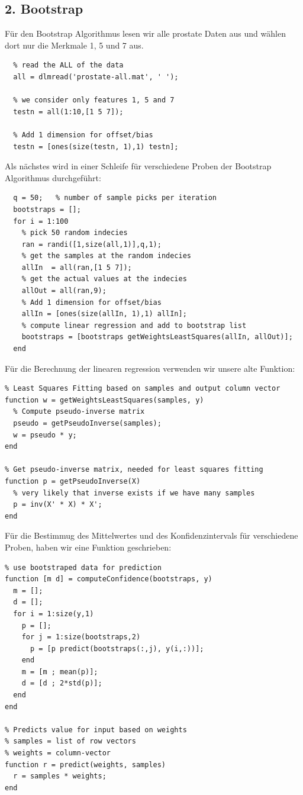 \documentclass{article}
\begin{document}
\subsection*{2. Bootstrap}
Für den Bootstrap Algorithmus lesen wir alle prostate Daten aus und wählen dort
nur die Merkmale 1, 5 und 7 aus.
\begin{lstlisting}
  % read the ALL of the data
  all = dlmread('prostate-all.mat', ' ');

  % we consider only features 1, 5 and 7
  testn = all(1:10,[1 5 7]);

  % Add 1 dimension for offset/bias
  testn = [ones(size(testn, 1),1) testn];
\end{lstlisting}
Als nächstes wird in einer Schleife für verschiedene Proben der Bootstrap
Algorithmus durchgeführt:
\begin{lstlisting}
  q = 50;   % number of sample picks per iteration
  bootstraps = [];
  for i = 1:100
    % pick 50 random indecies
    ran = randi([1,size(all,1)],q,1);
    % get the samples at the random indecies
    allIn  = all(ran,[1 5 7]);
    % get the actual values at the indecies
    allOut = all(ran,9);
    % Add 1 dimension for offset/bias
    allIn = [ones(size(allIn, 1),1) allIn];
    % compute linear regression and add to bootstrap list
    bootstraps = [bootstraps getWeightsLeastSquares(allIn, allOut)];
  end
\end{lstlisting}
Für die Berechnung der linearen regression verwenden wir unsere alte Funktion:
\begin{lstlisting}
% Least Squares Fitting based on samples and output column vector
function w = getWeightsLeastSquares(samples, y)
  % Compute pseudo-inverse matrix
  pseudo = getPseudoInverse(samples);
  w = pseudo * y;
end

% Get pseudo-inverse matrix, needed for least squares fitting
function p = getPseudoInverse(X)
  % very likely that inverse exists if we have many samples
  p = inv(X' * X) * X';
end
\end{lstlisting}
Für die Bestimmug des Mittelwertes und des Konfidenzintervals für verschiedene
Proben, haben wir eine Funktion geschrieben:
\begin{lstlisting}
% use bootstraped data for prediction
function [m d] = computeConfidence(bootstraps, y)
  m = [];
  d = [];
  for i = 1:size(y,1)
    p = [];
    for j = 1:size(bootstraps,2)
      p = [p predict(bootstraps(:,j), y(i,:))];
    end
    m = [m ; mean(p)];
    d = [d ; 2*std(p)];
  end
end

% Predicts value for input based on weights
% samples = list of row vectors
% weights = column-vector
function r = predict(weights, samples)
  r = samples * weights;
end
\end{lstlisting}
\end{document}

